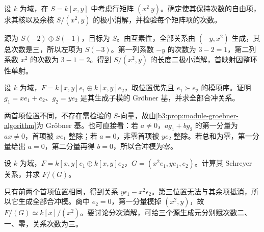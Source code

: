 \begin{exercise}\label{b3:ex:21-mixed-shifts}
	设 \(k\) 为域，在 \(S=k[x,y]\) 中考虑行矩阵 \((x^2\ y)\)。确定使其保持次数的自由项，求其核以及余核 \(S/(x^2,y)\) 的极小消解，并检验每个矩阵项的次数。
\end{exercise}
\begin{solution}
	源为 \(S(-2)\oplus S(-1)\)，目标为 \(S\)。由互素性，全部关系由 \((-y,x^2)\) 生成，其总次数是三，所以左项为 \(S(-3)\)。第一列系数 \(-y\) 的次数为 \(3-2=1\)，第二列系数 \(x^2\) 的次数为 \(3-1=2\)。得到 \(S/(x^2,y)\) 的长度二极小消解，首映射因整环性单射。
\end{solution}

\begin{exercise}\label{b3:ex:21-different-components}
	设 \(k\) 为域，\(F=k[x,y]e_1\oplus k[x,y]e_2\)，取位置优先且 \(e_1\succ e_2\) 的模项序。证明 \(g_1=xe_1+e_2\)、\(g_2=ye_2\) 是其生成子模的 Gröbner 基，并求全部合冲关系。
\end{exercise}
\begin{solution}
	两首项位置不同，不存在需检验的 \(S\)-向量，故由\cref{b3:prop:module-groebner-algorithm}为 Gröbner 基。也可直接看：若 \(a\ne0\)，\(ag_1+bg_2\) 的第一分量为 \(ax\ne0\)，首项被 \(xe_1\) 整除；若 \(a=0\)，非零首项被 \(ye_2\) 整除。若总和为零，第一分量给出 \(a=0\)，第二分量再得 \(b=0\)，所以合冲模为零。
\end{solution}

\begin{exercise}\label{b3:ex:21-same-component}
	设 \(k\) 为域，\(F=k[x,y]e_1\oplus k[x,y]e_2\)，\(G=(x^2e_1,ye_1,e_2)\)。计算其 Schreyer 关系，并求 \(F/(G)\)。
\end{exercise}
\begin{solution}
	只有前两个首项位置相同，得到关系 \(y\epsilon_1-x^2\epsilon_2\)。第三位置无法与其余项抵消，所以它生成全部合冲模。商中 \(e_2=0\)，第一分量模掉 \((x^2,y)\)，故 \(F/(G)\simeq k[x]/(x^2)\)。要讨论分次消解，可给三个源生成元分别赋次数二、一、零，关系次数为三。
\end{solution}

